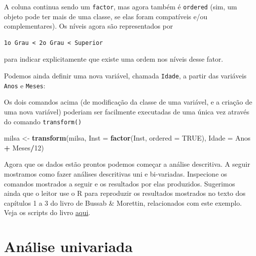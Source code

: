 \documentclass[10pt,a4paper]{book}
\newenvironment{Shaded}{\begin{snugshade}}{\end{snugshade}}
\newcommand{\KeywordTok}[1]{\textcolor[rgb]{0.13,0.29,0.53}{\textbf{#1}}}
\newcommand{\DataTypeTok}[1]{\textcolor[rgb]{0.13,0.29,0.53}{#1}}
\newcommand{\DecValTok}[1]{\textcolor[rgb]{0.00,0.00,0.81}{#1}}
\newcommand{\StringTok}[1]{\textcolor[rgb]{0.31,0.60,0.02}{#1}}
\newcommand{\OtherTok}[1]{\textcolor[rgb]{0.56,0.35,0.01}{#1}}
\newcommand{\OperatorTok}[1]{\textcolor[rgb]{0.81,0.36,0.00}{\textbf{#1}}}
\newcommand{\NormalTok}[1]{#1}
\begin{document}
A coluna continua sendo um \texttt{factor}, mas agora também é
\texttt{ordered} (sim, um objeto pode ter mais de uma classe, se elas
foram compatíveis e/ou complementares). Os níveis agora são
representados por

\begin{verbatim}
1o Grau < 2o Grau < Superior
\end{verbatim}

para indicar explicitamente que existe uma ordem nos níveis desse fator.

Podemos ainda definir uma nova variável, chamada \texttt{Idade}, a
partir das variáveis \texttt{Anos} e \texttt{Meses}:

\begin{Shaded}
\end{Shaded}

Os dois comandos acima (de modificação da classe de uma variável, e a
criação de uma nova variável) poderiam ser facilmente executadas de uma
única vez através do comando \texttt{transform()}

\begin{Shaded}
\begin{Highlighting}[]
\NormalTok{milsa <-}\StringTok{ }\KeywordTok{transform}\NormalTok{(milsa,}
                   \DataTypeTok{Inst =} \KeywordTok{factor}\NormalTok{(Inst, }\DataTypeTok{ordered =} \OtherTok{TRUE}\NormalTok{),}
                   \DataTypeTok{Idade =}\NormalTok{ Anos }\OperatorTok{+}\StringTok{ }\NormalTok{Meses}\OperatorTok{/}\DecValTok{12}\NormalTok{)}
\end{Highlighting}
\end{Shaded}

Agora que os dados estão prontos podemos começar a análise descritiva. A
seguir mostramos como fazer análises descritivas uni e bi-variadas.
Inspecione os comandos mostrados a seguir e os resultados por elas
produzidos. Sugerimos ainda que o leitor use o R para reproduzir os
resultados mostrados no texto dos capítulos 1 a 3 do livro de Bussab \&
Morettin, relacionados com este exemplo. Veja os scripts do livro
\href{https://rpubs.com/EstatBasica/Introd}{aqui}.

\section{Análise univariada}\label{analise-univariada}
\end{document}
